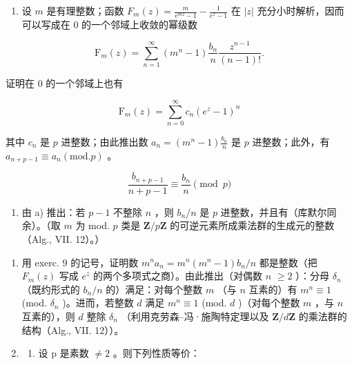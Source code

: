\begin{enumerate}
\def\labelenumi{\alph{enumi})}
\tightlist
\item
  设 \(m\) 是有理整数；函数 \(F_{m}(z) = \frac{m}{e^{mz} - 1} - \frac{1}{e^{z} - 1}\) 在 \(|z|\) 充分小时解析，因而可以写成在 0 的一个邻域上收敛的幂级数
\end{enumerate}

\[
\mathrm{F} _ {m} (z) = \sum_ {n = 1} ^ {\infty} (m ^ {n} - 1) \frac {b _ {n}}{n} \frac {z ^ {n - 1}}{(n - 1) !}.
\]

证明在 0 的一个邻域上也有

\[
\mathrm{F} _ {m} (z) = \sum_ {n = 0} ^ {\infty} c _ {n} (e ^ {z} - 1) ^ {n}
\]

其中 \(c_{n}\) 是 \(p\) 进整数；由此推出数 \(a_{n} = (m^{n} - 1)\frac{b_{n}}{n}\) 是 \(p\) 进整数；此外，有 \(a_{n + p - 1} \equiv a_{n} (\mathrm{mod.} p)\) 。

\[
\frac {b _ {n + p - 1}}{n + p - 1} \equiv \frac {b _ {n}}{n} \pmod {p}
\]

\begin{enumerate}
\def\labelenumi{\alph{enumi})}
\setcounter{enumi}{1}
\tightlist
\item
  由 a) 推出：若 \(p - 1\) 不整除 \(n\) ，则 \(b_{n} / n\) 是 \(p\) 进整数，并且有（库默尔同余）。（取 \(m\) 为 mod. \(p\) 类是 \(\mathbf{Z} / p\mathbf{Z}\) 的可逆元素所成乘法群的生成元的整数（Alg., VII. 12）。）
\end{enumerate}

\begin{enumerate}
\def\labelenumi{\arabic{enumi})}
\setcounter{enumi}{9}
\item
  用 exerc. 9 的记号，证明数 \(m^n a_n = m^n (m^n - 1)b_n / n\) 都是整数（把 \(F_m(z)\) 写成 \(e^z\) 的两个多项式之商）。由此推出（对偶数 \(n\) \(\geqslant 2\) ）：分母 \(\delta_n\) （既约形式的 \(b_n / n\) 的）满足：对每个整数 \(m\) （与 \(n\) 互素的）有 \(m^n \equiv 1\) (mod. \(\delta_n\) )。进而，若整数 \(d\) 满足 \(m^n \equiv 1\) (mod. \(d\) )（对每个整数 \(m\) ，与 \(n\) 互素的），则 \(d\) 整除 \(\delta_n\) （利用克劳森–冯·施陶特定理以及 \(\mathbf{Z} / d\mathbf{Z}\) 的乘法群的结构（Alg., VII. 12））。
\item
  \begin{enumerate}
  \def\labelenumii{\alph{enumii})}
  \tightlist
  \item
    设 p 是素数 \(\neq 2\) 。则下列性质等价：
  \end{enumerate}
\end{enumerate}

